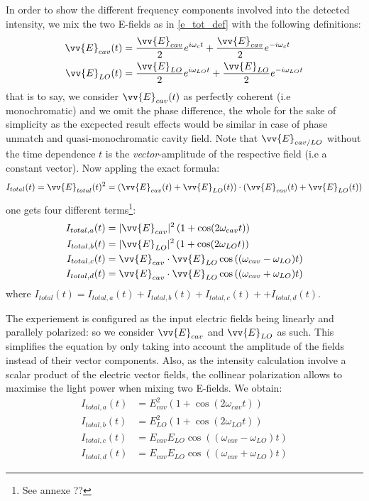 \documentclass[12pt]{report}
\begin{document}
In order to show the different frequency components involved into the detected intensity, we mix the two E-fields as in \eqref{e_tot_def} with the following definitions:
\begin{align}
\label{e_cav_e_lo}
\begin{split}
\vv{E}_{cav}(t) &=\frac{\vv{E}_{cav}}{2} e^{i\omega_{c}t} + \frac{\vv{E}_{cav}}{2} e^{-i\omega_{c}t} \\
\vv{E}_{LO}(t) &= \frac{\vv{E}_{LO}}{2} e^{i\omega_{LO}t} + \frac{\vv{E}_{LO}}{2} e^{-i\omega_{LO}t}
\end{split}
\end{align}that is to say, we consider $\vv{E}_{cav}(t)$ as perfectly coherent (i.e monochromatic) and we omit the phase difference, the whole for the sake of simplicity as the excpected result effects would be similar in case of phase unmatch and quasi-monochromatic cavity field. Note that $\vv{E}_{cav/LO}$ without the time dependence $t$ is the \textit{vector}-amplitude of the respective field (i.e a constant vector). Now appling the exact formula:
\begin{equation}
I_{total}(t) = \vv{E}_{total}(t)^2 = \left(\vv{E}_{cav}(t) + \vv{E}_{LO}(t)\right) \cdot \left(\vv{E}_{cav}(t) + \vv{E}_{LO}(t)\right)
\end{equation} 
one gets four different terms\footnote{See annexe ??}:
\begin{align}
I_{total,a}(t) &= \vert\vv{E}_{cav}\vert^2\left(1 + \cos(2\omega_{cav}t)\right)\\
I_{total,b}(t) &= \vert\vv{E}_{LO}\vert^2\left(1 + \cos(2\omega_{LO}t)\right)\\
I_{total,c}(t) &= \vv{E}_{cav}\cdot\vv{E}_{LO}\cos\left((\omega_{cav} - \omega_{LO})t\right)\\
I_{total,d}(t) &= \vv{E}_{cav}\cdot\vv{E}_{LO}\cos\left((\omega_{cav} + \omega_{LO})t\right)
\end{align}
where $I_{total}(t) = I_{total,a}(t) + I_{total,b}(t) + I_{total,c}(t) + + I_{total,d}(t)$.

The experiement is configured as the input electric fields being linearly and parallely polarized: so we consider $\vv{E}_{cav}$ and $\vv{E}_{LO}$ as such. This simplifies the equation by only taking into account the amplitude of the fields instead of their vector components. Also, as the intensity calculation involve a scalar product of the electric vector fields, the collinear polarization allows to maximise the light power when mixing two E-fields. We obtain:
\begin{align}
I_{total,a}(t) &= E_{cav}^2\left(1 + \cos(2\omega_{cav}t)\right)\\
I_{total,b}(t) &= E_{LO}^2\left(1 + \cos(2\omega_{LO}t)\right)\\
\label{mix_hetero_ic}
I_{total,c}(t) &= E_{cav}E_{LO}\cos\left((\omega_{cav} - \omega_{LO})t\right)\\
\label{mix_hetero_id}
I_{total,d}(t) &= E_{cav}E_{LO}\cos\left((\omega_{cav} + \omega_{LO})t\right)
\end{align}
\end{document}
